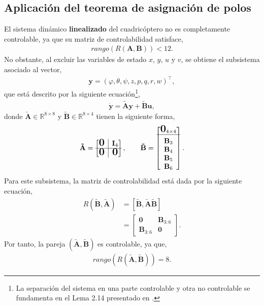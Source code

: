\subsection{Aplicación del teorema de asignación de polos}

El sistema dinámico \textbf{linealizado} del cuadricóptero no es completamente controlable, ya que su matriz de controlabilidad satisface,
\begin{align}
    rango\left(R(\mathbf{A},\mathbf{B})\right)<12.
\end{align}
No obstante, al excluir las variables de estado $x$, $y$, $u$ y $v$, se obtiene el subsistema asociado al vector,
\begin{align}
    \mathbf{y} = (\varphi, \theta, \psi, z, p, q, r, w)^{\top},
\end{align}
que está descrito por la siguiente ecuación\footnote{La separación del sistema en una parte controlable y otra no controlable se fundamenta en el Lema 2.14 presentado en \cite{Gruene2021}.},
\begin{align}
    \dot{\mathbf{y}} = \mathbf{\tilde{A}}\mathbf{y} + \mathbf{\tilde{B}}\mathbf{u},
\end{align}
donde $\mathbf{\tilde{A}}\in \mathbb{R}^{8\times 8}$ y $\mathbf{\tilde{B}}\in \mathbb{R}^{8\times 4}$ tienen la siguiente forma,
\begin{align}
\mathbf{\tilde{A}} =
    \begin{bmatrix}
    \bigzero & \rvline & \mathbf{I}_{4} \\ \hline 
    \bigzero & \rvline & \bigzero
    \end{bmatrix}, \qquad
\mathbf{\tilde{B}} = 
\begin{bmatrix}
    \bigzero_{4\times4} \\ \hline \\[-2ex]
    \mathbf{B}_{3}\\
    \mathbf{B}_{4}\\
    \mathbf{B}_{5}\\
    \mathbf{B}_{6}
\end{bmatrix}.
\label{eq:tilde_AB}
\end{align}
Para este subsistema, la matriz de controlabilidad está dada por la siguiente ecuación, 
\begin{equation}
\begin{aligned}
    R\left(\tilde{\mathbf{B}}, \tilde{\mathbf{A}}\right) &= [\tilde{\mathbf{B}}, \tilde{\mathbf{A}}\tilde{\mathbf{B}}]\\
    &= \begin{bmatrix}
        \mathbf{0} & \mathbf{B}_{3:6} \\
        \mathbf{B}_{3:6} & \mathbf{0}
        \end{bmatrix}.
\end{aligned}
\end{equation}
Por tanto, la pareja $(\mathbf{\tilde{A}},\mathbf{\tilde{B}})$ es controlable, ya que,
\begin{align}
    rango \left(R\left(\mathbf{\tilde{A}}, \mathbf{\tilde{B}}\right) \right)= 8.
\end{align}

